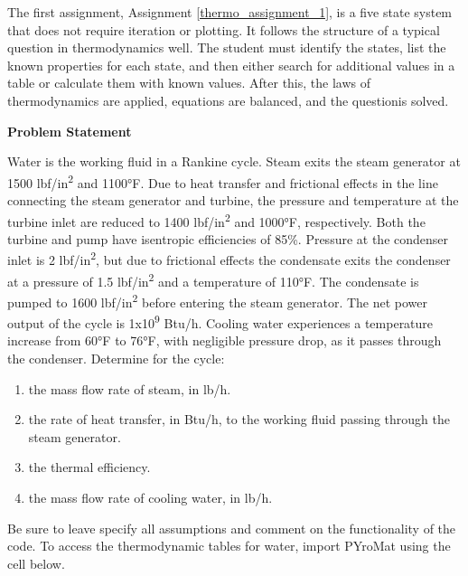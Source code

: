 The first assignment, Assignment \ref{thermo_assignment_1}, is a five state system that does not require 
iteration or plotting. It follows the structure of a typical question in thermodynamics well. The student 
must identify the states, list the known properties for each state, and then either search for additional 
values in a table or calculate them with known values. After this, the laws of thermodynamics are applied, 
equations are balanced, and the questionis solved.

\label{thermo_assignment_1}

\begin{tcolorbox}[breakable, enhanced jigsaw, title=ME 513: Assignment \ref{thermo_assignment_1}, 
    colframe=blue!70!white, colback=gray!20]

    \textbf{Problem Statement}

    Water is the working fluid in a Rankine cycle. Steam exits the steam generator at 1500 
    lbf/in\textsuperscript{2}  and 1100°F. Due to heat transfer and frictional effects in 
    the line connecting the steam generator and turbine, the pressure and temperature at the 
    turbine inlet are reduced to 1400 lbf/in\textsuperscript{2} and 1000°F, respectively. Both the 
    turbine and pump have isentropic efficiencies of 85\%. Pressure at the condenser inlet 
    is 2 lbf/in\textsuperscript{2}, but due to frictional effects the condensate exits the 
    condenser at a pressure of 1.5 lbf/in\textsuperscript{2} and a temperature of 110°F. The 
    condensate is pumped to 1600 lbf/in\textsuperscript{2} before entering the steam generator. 
    The net power output of the cycle is 1x10\textsuperscript{9} Btu/h. Cooling water experiences 
    a temperature increase from 60°F to 76°F, with negligible pressure drop, as it passes 
    through the condenser. Determine for the cycle:

    \begin{enumerate}
        \item the mass flow rate of steam, in lb/h.
        \item the rate of heat transfer, in Btu/h, to the working fluid passing through the steam 
        generator. 
        \item the thermal efficiency.
        \item the mass flow rate of cooling water, in lb/h.
    \end{enumerate}

    Be sure to leave specify all assumptions and comment on the functionality of the code. 
    To access the thermodynamic tables for water, import PYroMat using the cell below.


\end{tcolorbox}
